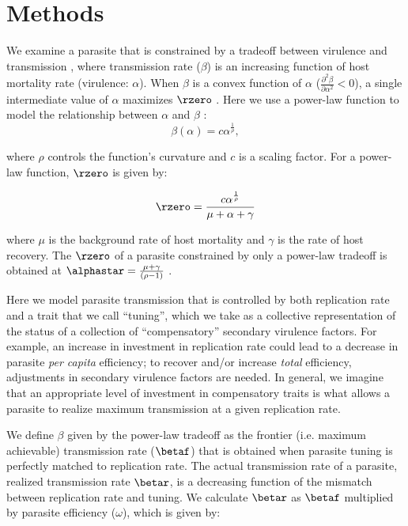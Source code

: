 \section*{Methods}

We examine a parasite that is constrained by a tradeoff between virulence and transmission \citep{AndersonandMay1982, Ewald1983}, where transmission rate ($\beta$) is an increasing function of host mortality rate (virulence: $\alpha$). When $\beta$ is a convex function of $\alpha$ ($\frac{\partial^2 \beta}{\partial \alpha^2} < 0$), a single intermediate value of $\alpha$ maximizes $\rzero$ \citep{Alizonetal.2009}. Here we use a power-law function to model the relationship between $\alpha$ and $\beta$ \citep{AlizonandvanBaalen2005, Bolkeretal.2010}: 
\begin{equation*}
\beta(\alpha) = c\alpha^{\frac{1}{\rho}},
\end{equation*}

\noindent where $\rho$ controls the function's curvature and $c$ is a scaling factor. For a power-law function, $\rzero$ is given by:

\begin{equation*}
\rzero = \frac{c\alpha^{\frac{1}{\rho}}}{\mu + \alpha + \gamma}
\end{equation*}

\noindent where $\mu$ is the background rate of host mortality and $\gamma$ is the rate of host recovery. The $\rzero$ of a parasite constrained by only a power-law tradeoff is obtained at $\alphastar = \frac{\mu + \gamma}{(\rho - 1)}$ \citep{Bolkeretal.2010, Kainetal.2018}. 

Here we model parasite transmission that is controlled by both replication rate and a trait that we call ``tuning'', which we take as a collective representation of the status of a collection of ``compensatory'' secondary virulence factors. For example, an increase in investment in replication rate could lead to a decrease in parasite \emph{per capita} efficiency; to recover and/or increase \emph{total} efficiency, adjustments in secondary virulence factors are needed. In general, we imagine that an appropriate level of investment in compensatory traits is what allows a parasite to realize maximum transmission at a given replication rate. 

We define $\beta$ given by the power-law tradeoff as the frontier (i.e. maximum achievable) transmission rate ($\betaf$) that is obtained when parasite tuning is perfectly matched to replication rate. The actual transmission rate of a parasite, realized transmission rate $\betar$, is a decreasing function of the mismatch between replication rate and tuning. We calculate $\betar$ as $\betaf$ multiplied by parasite efficiency ($\omega$), which is given by:

